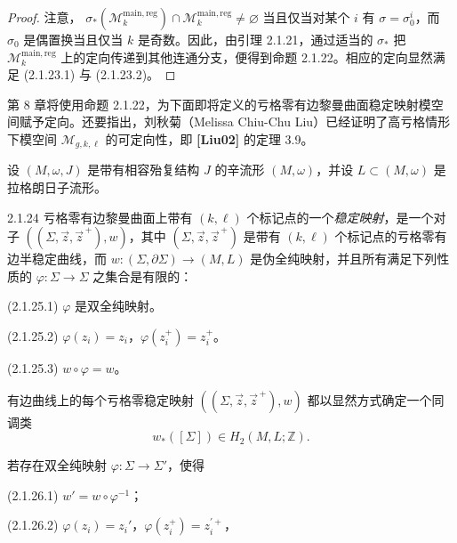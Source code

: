 \begin{proof}
注意，
$\sigma_*(\mathcal M_k^{\mathrm{main,reg}})
\cap\mathcal M_k^{\mathrm{main,reg}}\ne\varnothing$
当且仅当对某个 $i$ 有 $\sigma=\sigma_0^i$，而
$\sigma_0$ 是偶置换当且仅当 $k$ 是奇数。因此，由引理 2.1.21，通过适当的
$\sigma_*$ 把 $\mathcal M_k^{\mathrm{main,reg}}$ 上的定向传递到其他连通分支，便得到命题 2.1.22。相应的定向显然满足 (2.1.23.1) 与 (2.1.23.2)。
\end{proof}

第 8 章将使用命题 2.1.22，为下面即将定义的亏格零有边黎曼曲面稳定映射模空间赋予定向。还要指出，刘秋菊（Melissa Chiu-Chu Liu）已经证明了高亏格情形下模空间
$\mathcal M_{g,k,\ell}$ 的可定向性，即 \textbf{[Liu02]} 的定理 3.9。

设 $(M,\omega,J)$ 是带有相容殆复结构 $J$ 的辛流形 $(M,\omega)$，并设
$L\subset(M,\omega)$ 是拉格朗日子流形。

\begin{definition}{2.1.24}\label{def:2-1-24}
亏格零有边黎曼曲面上带有 $(k,\ell)$ 个标记点的一个\emph{稳定映射}，是一个对子
$((\Sigma,\vec z,\vec z^{\,+}),w)$，其中
$(\Sigma,\vec z,\vec z^{\,+})$ 是带有 $(k,\ell)$ 个标记点的亏格零有边半稳定曲线，而
$w:(\Sigma,\partial\Sigma)\to(M,L)$ 是伪全纯映射，并且所有满足下列性质的
$\varphi:\Sigma\to\Sigma$ 之集合是有限的：

\par\smallskip\noindent\textup{(2.1.25.1)}\quad
$\varphi$ 是双全纯映射。

\par\smallskip\noindent\textup{(2.1.25.2)}\quad
$\varphi(z_i)=z_i$，$\varphi(z_i^+)=z_i^+$。

\par\smallskip\noindent\textup{(2.1.25.3)}\quad
$w\circ\varphi=w$。
\end{definition}

有边曲线上的每个亏格零稳定映射
$((\Sigma,\vec z,\vec z^{\,+}),w)$ 都以显然方式确定一个同调类
\[
  w_*([\Sigma])\in H_2(M,L;\mathbb Z).
\]

若存在双全纯映射 $\varphi:\Sigma\to\Sigma'$，使得

\par\smallskip\noindent\textup{(2.1.26.1)}\quad
$w'=w\circ\varphi^{-1}$；

\par\smallskip\noindent\textup{(2.1.26.2)}\quad
$\varphi(z_i)=z_i'$，$\varphi(z_i^+)=z_i^{\prime+}$，

